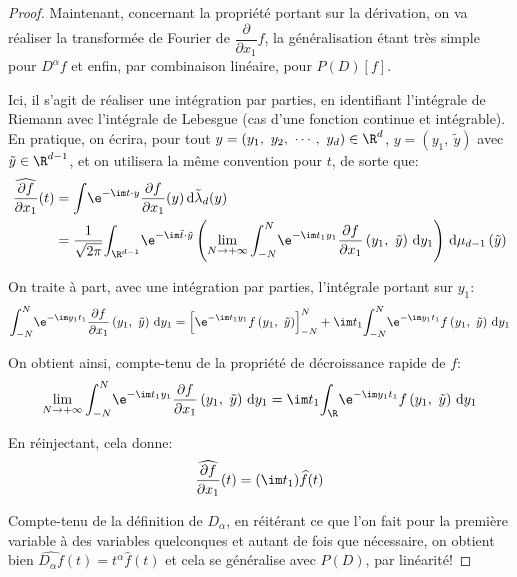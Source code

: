 \begin{proof}
Maintenant, concernant la propriété portant sur la dérivation, on va réaliser la transformée de Fourier de $\dfrac{\partial}{\partial x_1} f$, la généralisation étant très simple pour $D^{\alpha} f$ et enfin, par combinaison linéaire, pour $P(D)[f]$. 

Ici, il s'agit de réaliser une intégration par parties, en identifiant l'intégrale de Riemann avec l'intégrale de Lebesgue (cas d'une fonction continue et intégrable). En pratique, on écrira, pour tout $y = (y_1,~y_2,~\cdots,~y_d) \in \R^d$, $y = \left (y_1,~\tilde{y}\right )$ avec $\tilde{y} \in \R^{d-1}$, et on utilisera la même convention pour $t$, de sorte que:
\begin{align*}
\widehat{\frac{\partial f}{\partial x_1}}(t) & =  \displaystyle{\int}  \e^{-\im t \cdot y} \frac{\partial f}{\partial x_1} (y) \, \mathrm d \tilde{\lambda}_d(y) \\
 & = \frac{1}{\sqrt{2\pi}} \displaystyle{\int_{\R^{d-1}}} \e^{-\im \tilde{t} \cdot \tilde{y}} \left ( \lim \limits_{N \to +\infty} \displaystyle{\int_{-N}^N} \e^{-\im t_1 y_1} \frac{\partial f}{\partial x_1} \left (y_1,~\tilde{y}\right ) \, \mathrm d y_1 \right ) \, \mathrm d \mu_{d-1} \left ( \tilde{y}\right )
\end{align*}

On traite à part, avec une intégration par parties, l'intégrale portant sur $y_1$:
\[
\displaystyle{\int_{-N}^N} \e^{-\im y_1 t_1} \frac{\partial f}{\partial x_1} \left (y_1,~\tilde{y}\right ) \, \mathrm d y_1 = \left [ \e^{-\im t_1 y_1} f\left (y_1,~\tilde{y}\right ) \right ]_{-N}^N + \im t_1 \displaystyle{\int_{-N}^N} \e^{-\im y_1 t_1} f\left (y_1,~\tilde{y}\right ) \, \mathrm d y_1
\]

On obtient ainsi, compte-tenu de la propriété de décroissance rapide de $f$:
\[
\lim \limits_{N \to +\infty} \displaystyle{\int_{-N}^N} \e^{-\im t_1 y_1} \frac{\partial f}{\partial x_1} \left (y_1,~\tilde{y}\right ) \, \mathrm d y_1 = \im t_1 \displaystyle{\int_{\R}} \e^{-\im y_1 t_1} f\left (y_1,~\tilde{y}\right ) \, \mathrm d y_1
\]

En réinjectant, cela donne:
\[
\widehat{\frac{\partial f}{\partial x_1}}(t) = (\im t_1) \widehat{f}(t)
\]

Compte-tenu de la définition de $D_{\alpha}$, en réitérant ce que l'on fait pour la première variable à des variables quelconques et autant de fois que nécessaire, on obtient bien $\widehat{D_{\alpha} f}(t) = t^{\alpha} \widehat{f}(t)$ et cela se généralise avec $P(D)$, par linéarité!


\end{proof}
